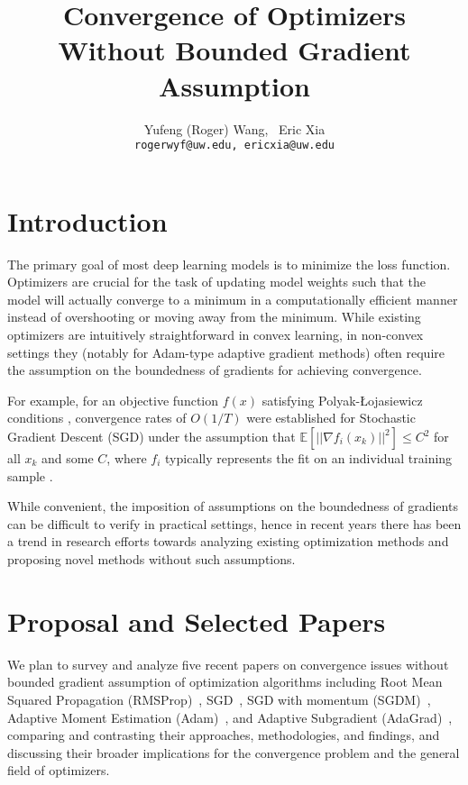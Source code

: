 \documentclass{article}
\title{Convergence of Optimizers Without Bounded Gradient Assumption}
\author{%
  Yufeng (Roger) Wang, \ Eric Xia \\
  \texttt{rogerwyf@uw.edu, ericxia@uw.edu} \\
}
\begin{document}
\maketitle


\section{Introduction}

The primary goal of most deep learning models is to minimize the loss function.
Optimizers are crucial for the task of updating model weights such that the model will actually converge to a minimum in a computationally efficient manner instead of overshooting or moving away from the minimum. While existing optimizers are intuitively straightforward in convex learning, in non-convex settings they (notably for Adam-type adaptive gradient methods)
often require the assumption on the boundedness of gradients for achieving convergence.

For example, for an objective function  $f(x)$ satisfying
Polyak-Łojasiewicz conditions \cite{POLYAK1963864},  convergence rates of $O(1/T)$ were established for Stochastic Gradient Descent (SGD) under the assumption that $\mathbb{E}[||\nabla f_i(x_k)||^2] \leq C^2$ for all $x_k$ and some $C$, where $f_i$ typically represents the fit on an individual training sample \cite{DBLP:journals/corr/KarimiNS16}.

While convenient, the imposition of assumptions on the boundedness of gradients can be difficult to verify in practical settings, hence in recent years there has been a trend in research efforts towards analyzing existing optimization methods and proposing novel methods without such assumptions.

\section{Proposal and Selected Papers}
We plan to survey and analyze five recent papers on convergence issues without bounded gradient assumption of optimization algorithms
including Root Mean Squared Propagation (RMSProp)~\cite{shi2021rmsprop}, SGD~\cite{https://doi.org/10.48550/arxiv.2006.10311},
SGD with momentum (SGDM)~\cite{NEURIPS2020_d3f5d4de}, Adaptive Moment Estimation (Adam)~\cite{https://doi.org/10.48550/arxiv.2106.08208}, and Adaptive Subgradient (AdaGrad)~\cite{https://doi.org/10.48550/arxiv.2202.05791},
comparing and contrasting their approaches, methodologies, and findings, and discussing their broader implications for the convergence problem and the general field of optimizers.
\end{document}
